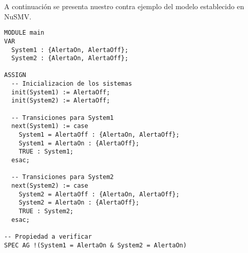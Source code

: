 A continuación se presenta nuestro contra ejemplo del modelo establecido en NuSMV.
\begin{lstlisting}
MODULE main
VAR
  System1 : {AlertaOn, AlertaOff};
  System2 : {AlertaOn, AlertaOff};

ASSIGN
  -- Inicializacion de los sistemas
  init(System1) := AlertaOff;
  init(System2) := AlertaOff;

  -- Transiciones para System1
  next(System1) := case
    System1 = AlertaOff : {AlertaOn, AlertaOff};
    System1 = AlertaOn : {AlertaOff};
    TRUE : System1;
  esac;

  -- Transiciones para System2
  next(System2) := case
    System2 = AlertaOff : {AlertaOn, AlertaOff};
    System2 = AlertaOn : {AlertaOff};
    TRUE : System2;
  esac;

-- Propiedad a verificar
SPEC AG !(System1 = AlertaOn & System2 = AlertaOn)

\end{lstlisting}
